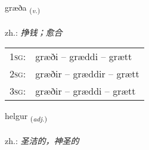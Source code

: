 \documentclass[frontgrid, backgrid]{flacards}\usepackage[]{graphicx}\usepackage[]{xcolor}
\begin{document}
\renewcommand{\flhead}{\vskip5pt \fboxsep=0pt {\small\bfseries\footnotesize Sagnorð | 动词}}
\renewcommand{\fcfoot}{\vskip5pt \fboxsep=0pt \hspace{2pt}{\small\bfseries\footnotesize 3K}}

\renewcommand{\blhead}{\vskip5pt {\small\bfseries\footnotesize Sagnorð | 动词 }}
\renewcommand{\bcfoot}{\vskip5pt \hspace{2pt}{\small\bfseries\footnotesize 3K}}


{græða \small{\textsubscript{(\textit{v.})}} \\[1ex] %
\textphonetic{[kraiːða]} \\
zh.: \emph{挣钱；愈合} \\  [2ex]
\renewcommand*{\arraystretch}{0.8}
\begin{tabular}{p{1cm}l}
\textsc{1sg}: & græði -- græddi -- grætt \\ 
\textsc{2sg}: & græðir -- græddir -- grætt \\ 
\textsc{3sg}: & græðir -- græddi -- grætt \\ 
\end{tabular}
}

\renewcommand{\flhead}{\vskip5pt \fboxsep=0pt {\small\bfseries\footnotesize Lýsingarorð | 形容词}}
\renewcommand{\fcfoot}{\vskip5pt \fboxsep=0pt \hspace{2pt}{\small\bfseries\footnotesize 3K}}

\renewcommand{\blhead}{\vskip5pt {\small\bfseries\footnotesize Lýsingarorð | 形容词 }}
\renewcommand{\bcfoot}{\vskip5pt \hspace{2pt}{\small\bfseries\footnotesize 3K}}


{helgur \small{\textsubscript{(\textit{adj.})}} \\[1ex] %
\textphonetic{[hɛlkʏr]} \\
zh.: \emph{圣洁的，神圣的} \\  [2ex]
\renewcommand*{\arraystretch}{0.8}
}
\end{document}
